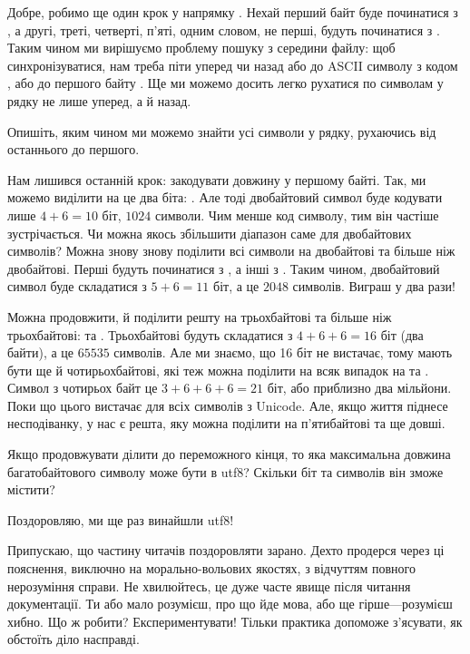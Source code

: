 Добре, робимо ще один крок у напрямку .
Нехай перший байт буде починатися з , а другі, треті, четверті, п'яті, одним словом, не перші, будуть починатися з .
Таким чином ми вирішуємо проблему пошуку з середини файлу: щоб синхронізуватися, нам треба піти уперед чи назад або до ASCII символу з кодом , або до першого байту .
Ще ми можемо досить легко рухатися по символам у рядку не лише уперед, а й назад.

\begin{exercise}
Опишіть, яким чином ми можемо знайти усі символи у рядку, рухаючись від останнього до першого.
\end{exercise}

Нам лишився останній крок: закодувати довжину у першому байті.
Так, ми можемо виділити на це два біта: .
Але тоді двобайтовий символ буде кодувати лише $4+6=10$ біт, $1024$ символи.
Чим менше код символу, тим він частіше зустрічається.
Чи можна якось збільшити діапазон саме для двобайтових символів?
Можна знову знову поділити всі символи на двобайтові та більше ніж двобайтові.
Перші будуть починатися з , а інші з .
Таким чином, двобайтовий символ буде складатися з $5+6=11$ біт, а це $2048$ символів.
Виграш у два рази!

Можна продовжити, й поділити решту на трьохбайтові та більше ніж трьохбайтові:  та .
Трьохбайтові будуть складатися з $4+6+6=16$ біт (два байти), а це $65535$ символів.
Але ми знаємо, що 16 біт не вистачає, тому мають бути ще й чотирьохбайтові, які теж можна поділити на всяк випадок на  та .
Символ з чотирьох байт це $3+6+6+6=21$ біт, або приблизно два мільйони.
Поки що цього вистачає для всіх символів з Unicode.
Але, якщо життя піднесе несподіванку, у нас є решта, яку можна поділити на п'ятибайтові та ще довші.

\begin{exercise}
Якщо продовжувати ділити до переможного кінця, то яка максимальна довжина багатобайтового символу може бути в utf8?
Скільки біт та символів він зможе містити?
\end{exercise}

Поздоровляю, ми ще раз винайшли utf8!

\medskip

Припускаю, що частину читачів поздоровляти зарано.
Дехто продерся через ці пояснення, виключно на морально-вольових якостях, з відчуттям повного нерозуміння справи.
Не хвилюйтесь, це дуже часте явище після читання документації.
Ти або мало розумієш, про що йде мова, або ще гірше---розумієш хибно.
Що ж робити? Експериментувати!
Тільки практика допоможе з'ясувати, як обстоїть діло насправді.

